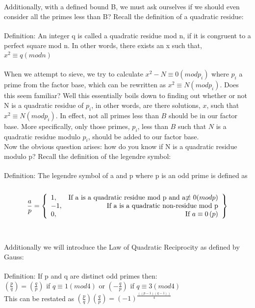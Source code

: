 \documentclass[12pt]{article} %
\begin{document}
	\\\\
	Additionally, with a defined bound B, we must ask ourselves if we should even consider all the primes less than B? Recall the definition of a quadratic residue:
	\\\\
	Definition: An integer q is called a quadratic residue mod n, if it is congruent to a perfect square mod n. In other words, there exists an x such that, $x^{2} \equiv q(mod  n)$ 
	\\\\
	When we attempt to sieve, we try to calculate $x^{2}-N\equiv 0(mod p_i)$ where $p_i$ a prime from the factor base, which can be rewritten as $x^{2} \equiv N(mod p_i)$. Does this seem familiar? Well this essentially boils down to finding out whether or not N is a quadratic residue of $p_i$, in other words, are there solutions, $x$, such that $x^{2}\equiv N(mod p_i)$. In effect, not all primes less than $B$ should be in our factor base. More specifically, only those primes, $p_i$, less than $B$ such that $N$ is a quadratic residue modulo $p_i$, should be added to our factor base. 
	\\\indent Now the obvious question arises: how do you know if N is a quadratic residue modulo p? Recall the definition of the legendre symbol:
	\\\\
	Definition: The legendre symbol of a and p where p is an odd prime is defined as 
	\\\\
	\[
	\frac{a}{p} = \left\{\begin{array}{lr}
	1, & \textmd{If a is a quadratic residue mod p and a$\not\equiv$ 0$\left(mod p\right)$}\\
	-1, & \textmd{If a is a quadratic non-residue mod p}\\
	0, & \textmd{If $a\equiv 0\left(p\right)$}\\
	\end{array}\right\}
	\]
	\\\\Additionally we will introduce the Law of Quadratic Reciprocity as defined by Gauss:
	\\\\Definition: If p and q are distinct odd primes then:
	\\$\left(\frac{p}{q}\right) = \left(\frac{q}{p}\right)$ if $q\equiv 1(mod 4)$ or $\left(-\frac{q}{p}\right)$ if $q\equiv 3(mod 4)$
	\\This can be restated as $\left(\frac{p}{q}\right)\left(\frac{q}{p}\right) = \left(-1\right)^{\frac{\left((p-1)(q-1)\right)}{4}}$
\end{document}
